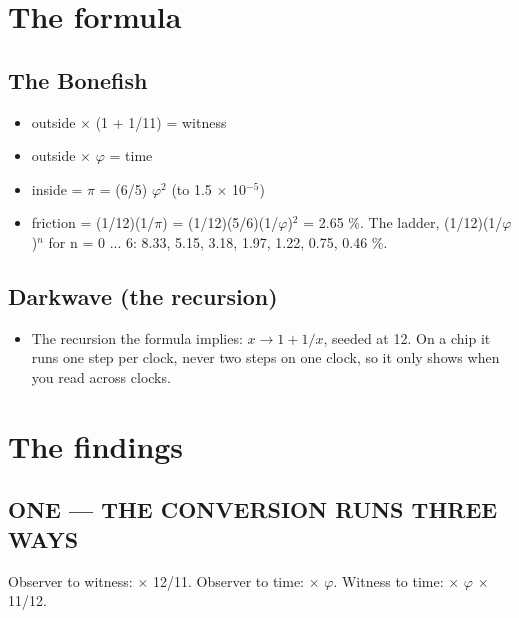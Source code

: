 \documentclass[11pt]{article}
\begin{document}
\section{The formula}
\subsection*{The Bonefish}
\begin{itemize}
\item outside \(\times\) (1 + 1/11) = witness
\item outside \(\times\) \(\varphi\) = time
\item inside = \(\pi\) = (6/5) \(\varphi\)\(^{2}\) (to 1.5 \(\times\) 10\(^{-5}\))
\item friction = (1/12)(1/\(\pi\)) = (1/12)(5/6)(1/\(\varphi\))\(^{2}\) = 2.65 \%. The ladder, (1/12)(1/\(\varphi\))\(^{n}\) for n = 0 ... 6: 8.33, 5.15, 3.18, 1.97, 1.22, 0.75, 0.46 \%.
\end{itemize}
\subsection*{Darkwave (the recursion)}
\begin{itemize}
\item The recursion the formula implies: \(x \to 1 + 1/x\), seeded at 12. On a chip it runs one step per clock, never two steps on one clock, so it only shows when you read across clocks.
\end{itemize}
\section{The findings}
\subsection{ONE --- THE CONVERSION RUNS THREE WAYS}
Observer to witness: \(\times\) 12/11. Observer to time: \(\times\) \(\varphi\). Witness to time: \(\times\) \(\varphi\) \(\times\) 11/12.
\end{document}
